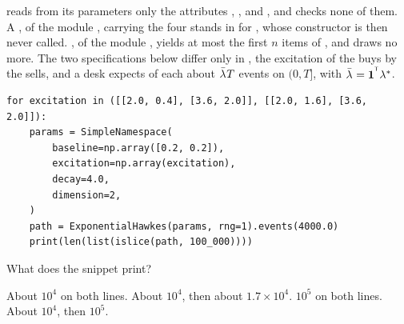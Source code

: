 \begin{question}
\label{question.lookalikeKernelsOneSupercritical}
 reads from its parameters
only the attributes , ,  and ,
and checks none of them.
A , of the module , carrying the four
stands in for , whose constructor is then never called.
, of the module ,
yields at most the first $n$ items of , and draws no more.
The two specifications below differ only in ,
the excitation of the buys by the sells,
and a desk expects of each about $\bar{\lambda_{ }} T$ events on $(0, T]$,
with $\bar{\lambda_{ }} = \mathbf{1}^{^{\mathsf{T}}}\lambda_{ }^{*}$.
\begin{lstlisting}[caption={Two paths, each stopped at $10^{5}$ events}, label=listing.lookalikeKernelsOneSupercritical]
for excitation in ([[2.0, 0.4], [3.6, 2.0]], [[2.0, 1.6], [3.6, 2.0]]):
    params = SimpleNamespace(
        baseline=np.array([0.2, 0.2]),
        excitation=np.array(excitation),
        decay=4.0,
        dimension=2,
    )
    path = ExponentialHawkes(params, rng=1).events(4000.0)
    print(len(list(islice(path, 100_000))))
\end{lstlisting}
What does the snippet print?
\begin{choices}
 \choice About $10^{4}$ on both lines.
 \choice About $10^{4}$, then about $1.7 \times 10^{4}$.
 \choice $10^{5}$ on both lines.
 \correctchoice About $10^{4}$, then $10^{5}$.
\end{choices}
\end{question}

